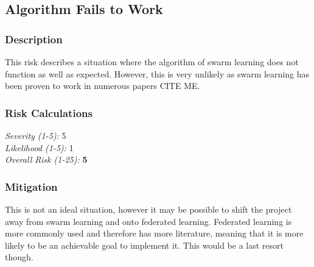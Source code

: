 \subsection{Algorithm Fails to Work}
\subsubsection{Description}
This risk describes a situation where the algorithm of swarm learning does not function as well as expected. However, this is very unlikely as swarm learning has been proven to work in numerous papers CITE ME.

\subsubsection{Risk Calculations}
\emph{Severity (1-5):} 5 \\
\emph{Likelihood (1-5):} 1 \\
\emph{Overall Risk (1-25):} \textbf{5}

\subsubsection{Mitigation}
This is not an ideal situation, however it may be possible to shift the project away from swarm learning and onto federated learning. Federated learning is more commonly used and therefore has more literature, meaning that it is more likely to be an achievable goal to implement it. This would be a last resort though.